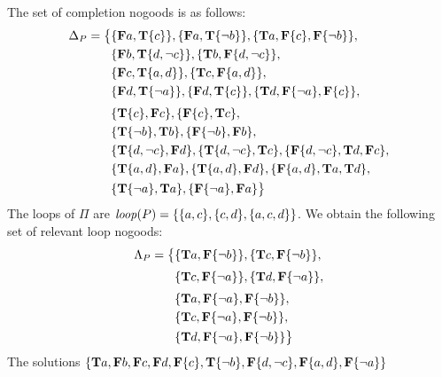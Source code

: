\begin{Loesung}%
\newline\noindent\textnormal{%
The set of completion nogoods is as follows:
\begin{align*}
  \Delta_P = \big\{ &    
  \{\mathbf{F}a,\mathbf{T}\{c\}\},\{\mathbf{F}a,\mathbf{T}\{{\neg{b}}\}\},
  \{\mathbf{T}a,\mathbf{F}\{c\},\mathbf{F}\{{\neg{b}}\}\},
  {} \\ &
  \{\mathbf{F}b,\mathbf{T}\{d,{\neg{c}}\}\},\{\mathbf{T}b,\mathbf{F}\{d,{\neg{c}}\}\},
  {} \\ &
  \{\mathbf{F}c,\mathbf{T}\{a,d\}\},\{\mathbf{T}c,\mathbf{F}\{a,d\}\},
  {} \\ &
  \{\mathbf{F}d,\mathbf{T}\{{\neg{a}}\}\},\{\mathbf{F}d,\mathbf{T}\{c\}\},
  \{\mathbf{T}d,\mathbf{F}\{{\neg{a}}\},\mathbf{F}\{c\}\},
  {} \\[1mm] &
  \{\mathbf{T}\{c\},\mathbf{F}c\},
  \{\mathbf{F}\{c\},\mathbf{T}c\},
  {} \\ &
  \{\mathbf{T}\{{\neg{b}}\},\mathbf{T}b\},
  \{\mathbf{F}\{{\neg{b}}\},\mathbf{F}b\},
  {} \\ &
  \{\mathbf{T}\{d,{\neg{c}}\},\mathbf{F}d\},
  \{\mathbf{T}\{d,{\neg{c}}\},\mathbf{T}c\},
  \{\mathbf{F}\{d,{\neg{c}}\},\mathbf{T}d,\mathbf{F}c\},
  {} \\ &
  \{\mathbf{T}\{a,d\},\mathbf{F}a\},
  \{\mathbf{T}\{a,d\},\mathbf{F}d\},
  \{\mathbf{F}\{a,d\},\mathbf{T}a,\mathbf{T}d\},
  {} \\ &
  \{\mathbf{T}\{{\neg{a}}\},\mathbf{T}a\},
  \{\mathbf{F}\{{\neg{a}}\},\mathbf{F}a\}
  \big\}
\end{align*}
The loops of $\Pi$ are $\mathit{loop}(P)=\{\{a,c\},\{c,d\},\{a,c,d\}\}$.
We obtain the following set of relevant loop nogoods:
\begin{align*}
  \Lambda_\Pi%
  = \big\{ &    
  \{\mathbf{T}a,\mathbf{F}\{\naf b\}\},
  \{\mathbf{T}c,\mathbf{F}\{\naf b\}\},
  {} \\[1mm] &  
  \{\mathbf{T}c,\mathbf{F}\{\naf a\}\},
  \{\mathbf{T}d,\mathbf{F}\{\naf a\}\},
  {} \\[1mm] &  
  \{\mathbf{T}a,\mathbf{F}\{\naf a\},\mathbf{F}\{\naf b\}\},
  {} \\ &
  \{\mathbf{T}c,\mathbf{F}\{\naf a\},\mathbf{F}\{\naf b\}\},
  {} \\ &
  \{\mathbf{T}d,\mathbf{F}\{\naf a\},\mathbf{F}\{\naf b\}\}
  \big\}
\end{align*}
The solutions
$\{\mathbf{T}a,\mathbf{F}b,\mathbf{F}c,\mathbf{F}d,
   \mathbf{F}\{c\},\mathbf{T}\{{\neg{b}}\},\mathbf{F}\{d,{\neg{c}}\},\mathbf{F}\{a,d\},\mathbf{F}\{{\neg{a}}\}\}$
}
\end{Loesung}
